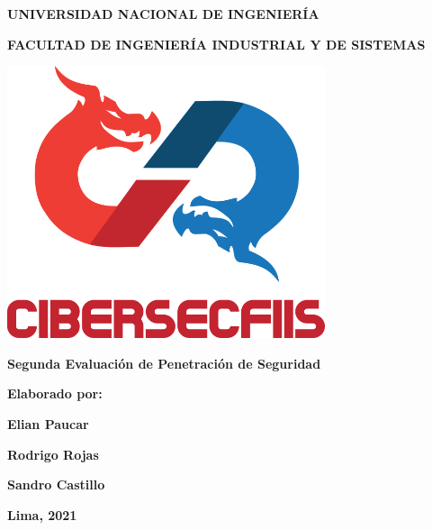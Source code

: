 \begin{titlepage}
    \centering
        {\large \textbf{UNIVERSIDAD NACIONAL DE INGENIERÍA}} \par \vspace{0.3cm}
        {\large \textbf{FACULTAD DE INGENIERÍA INDUSTRIAL Y DE SISTEMAS}} \par \vspace{1.5cm}
        \includegraphics[width=0.7\textwidth]{imagenes/CiberSecFIIS.png}\par \vspace{1.5cm}
        \vfill
        {\LARGE \textbf{Segunda Evaluación de Penetración de Seguridad}} \par \vspace{1.5cm}
        \vfill
        {\Large \textbf{Elaborado por:}} \par \vspace{1cm}
        {\large \textbf{Elian Paucar}} \par \vspace{0.8cm}
        {\large \textbf{Rodrigo Rojas}} \par \vspace{0.8cm}
        {\large \textbf{Sandro Castillo}} \par \vspace{3.55cm}
        \vfill
        {\textbf{Lima, 2021}}
\end{titlepage}